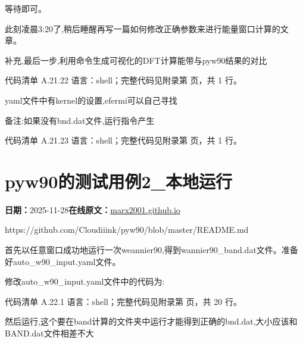 \documentclass[lang=cn,scheme=chinese,color=blue,device=normal,toc=onecol,math=cm]{elegantbook}
\begin{document}
等待即可。\par


此刻凌晨3:20了,稍后睡醒再写一篇如何修改正确参数来进行能量窗口计算的文章。\par


补充,最后一步,利用命令生成可视化的DFT计算能带与pyw90结果的对比\par


\begin{codeindexbox}{代码清单 A.21.22}
语言：shell；完整代码见附录第 \pageref{code:21:22} 页，共 1 行。
\end{codeindexbox}


yaml文件中有kernel的设置,efermi可以自己寻找\par


备注:如果没有bnd.dat文件,运行指令产生\par


\begin{codeindexbox}{代码清单 A.21.23}
语言：shell；完整代码见附录第 \pageref{code:21:23} 页，共 1 行。
\end{codeindexbox}



\section{pyw90的测试用例2\_\allowbreak{}本地运行}
\begin{articlemeta}
\textbf{日期：}2025-11-28\hfill\textbf{在线原文：}\href{https://marx2001.github.io/sci-note\_posts/20251128-pyw-auto}{marx2001.github.io}
\end{articlemeta}

https:/\allowbreak{}/\allowbreak{}github.com/\allowbreak{}Cloudiiink/\allowbreak{}pyw90/\allowbreak{}blob/\allowbreak{}master/\allowbreak{}README.md\par


首先以任意窗口成功地运行一次weannier90,得到wannier90\_\allowbreak{}band.dat文件。准备好auto\_\allowbreak{}w90\_\allowbreak{}input.yaml文件。\par


修改auto\_\allowbreak{}w90\_\allowbreak{}input.yaml文件中的代码为:\par


\begin{codeindexbox}{代码清单 A.22.1}
语言：shell；完整代码见附录第 \pageref{code:22:1} 页，共 20 行。
\end{codeindexbox}


然后运行,这个要在band计算的文件夹中运行才能得到正确的bnd.dat,大小应该和BAND.dat文件相差不大\par
\end{document}
